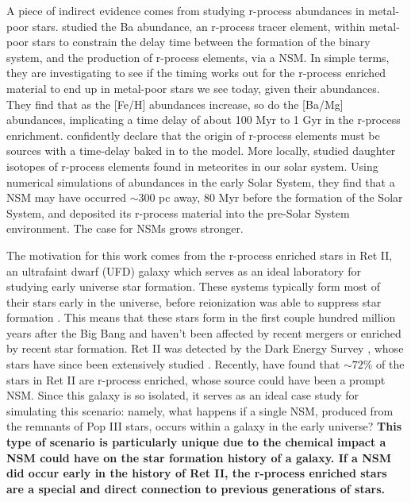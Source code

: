 \documentclass[fleqn,usenatbib]{mnras}
\begin{document}
A piece of indirect evidence comes from studying r-process abundances in metal-poor stars. \citet{Tarumi21} studied the Ba abundance, an r-process tracer element, within metal-poor stars to constrain the delay time between the formation of the binary system, and the production of r-process elements, via a NSM. In simple terms, they are investigating to see if the timing works out for the r-process enriched material to end up in metal-poor stars we see today, given their abundances. They find that as the [Fe/H] abundances increase, so do the [Ba/Mg] abundances, implicating a time delay of about 100 Myr to 1 Gyr in the r-process enrichment. \citet{Tarumi21} confidently declare that the origin of r-process elements must be sources with a time-delay baked in to the model. More locally, \citet{Bartos19} studied daughter isotopes of r-process elements found in meteorites in our solar system. Using numerical simulations of abundances in the early Solar System, they find that a NSM may have occurred $\sim 300$ pc away, 80 Myr before the formation of the Solar System, and deposited its r-process material into the pre-Solar System environment. The case for NSMs grows stronger.

The motivation for this work comes from the r-process enriched stars in Ret II, an ultrafaint dwarf (UFD) galaxy which serves as an ideal laboratory for studying early universe star formation. These systems typically form most of their stars early in the universe, before reionization was able to suppress star formation \citep{Weisz14}. This means that these stars form in the first couple hundred million years after the Big Bang and haven't been affected by recent mergers or enriched by recent star formation. Ret II was detected by the Dark Energy Survey \citep{Bechtol15}, whose stars have since been extensively studied \citep{Simon15, Roederer16, Ji16, Ji22}. Recently, \citet{Ji22} have found that $\sim 72\%$ of the stars in Ret II are r-process enriched, whose source could have been a prompt NSM. Since this galaxy is so isolated, it serves as an ideal case study for simulating this scenario: namely, what happens if a single NSM, produced from the remnants of Pop III stars, occurs within a galaxy in the early universe? \textbf{This type of scenario is particularly unique due to the chemical impact a NSM could have on the star formation history of a galaxy. If a NSM did occur early in the history of Ret II, the r-process enriched stars are a special and direct connection to previous generations of stars.}
\end{document}
